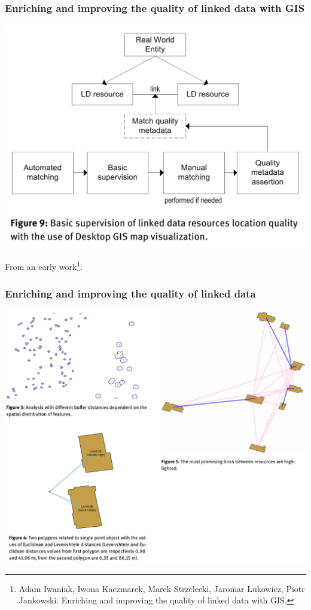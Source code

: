 \documentclass[10pt]{beamer}
\begin{document}
\begin{frame}
  \frametitle{Enriching and improving the quality of linked data
with GIS}
  \begin{center}
   \includegraphics[width=0.7\linewidth]{deducing-rels.png}
 \end{center}
 From an early work\footnote{Adam Iwaniak, Iwona Kaczmarek, Marek Strzelecki, Jaromar Lukowicz, Piotr Jankowski. Enriching and improving the quality of linked data with GIS. }.
\end{frame}

\begin{frame}
  \frametitle{Enriching and improving the quality of linked data}

  \begin{center}
   \includegraphics[width=0.8\linewidth]{joining-objs.png}
 \end{center}
\end{frame}
\end{document}

